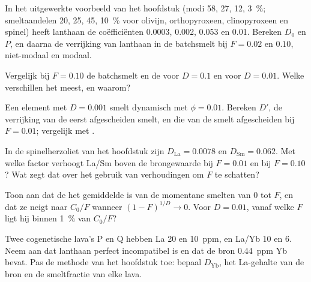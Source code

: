 \begin{exercise}[$\star\star$]\label{exo:b3:trace-element-modelling:6}
In het uitgewerkte voorbeeld van het hoofdstuk (modi 58, 27, 12, \qty{3}{\percent};
smeltaandelen 20, 25, 45, \qty{10}{\percent} voor olivijn,
orthopyroxeen, clinopyroxeen en spinel) heeft lanthaan de coëfficiënten
0.0003, 0.002, 0.053 en 0.01. Bereken $D_0$ en $P$, en daarna de verrijking van
lanthaan in de batchsmelt bij $F = 0.02$ en $0.10$, niet-modaal en modaal.
\end{exercise}

\begin{exercise}[$\star\star$]\label{exo:b3:trace-element-modelling:7}
Vergelijk bij $F = 0.10$ de batchsmelt en de  voor
$D = 0.1$ en voor $D = 0.01$. Welke verschillen het meest, en waarom?
\end{exercise}

\begin{exercise}[$\star\star$]\label{exo:b3:trace-element-modelling:8}
Een element met $D = 0.001$ smelt dynamisch met $\phi = 0.01$. Bereken
$D'$, de verrijking van de eerst afgescheiden smelt, en die van de smelt
afgescheiden bij $F = 0.01$; vergelijk met .
\end{exercise}

\begin{exercise}[$\star\star$]\label{exo:b3:trace-element-modelling:9}
In de spinelherzoliet van het hoofdstuk zijn $D_{\mathrm{La}} = 0.0078$ en
$D_{\mathrm{Sm}} = 0.062$. Met welke factor verhoogt  La/Sm boven de
brongewaarde bij $F = 0.01$ en bij $F = 0.10$? Wat zegt dat over
het gebruik van verhoudingen om $F$ te schatten?
\end{exercise}

\begin{exercise}[$\star\star\star$]\label{exo:b3:trace-element-modelling:10}
Toon aan dat de  het gemiddelde is van de momentane
smelten van 0 tot $F$, en dat ze neigt naar $C_0/F$ wanneer $(1 - F)^{1/D} \to 0$.
Voor $D = 0.01$, vanaf welke $F$ ligt hij binnen \qty{1}{\percent} van $C_0/F$?
\end{exercise}

\begin{exercise}[$\star\star\star$]\label{exo:b3:trace-element-modelling:11}
Twee cogenetische lava's P en Q hebben La 20 en \qty{10}{ppm}, en La/Yb 10 en 6.
Neem aan dat lanthaan perfect incompatibel is en dat de bron
\qty{0.44}{ppm} Yb bevat. Pas de methode van het hoofdstuk toe: bepaal $D_{\mathrm{Yb}}$,
het La-gehalte van de bron en de smeltfractie van elke lava.
\end{exercise}


